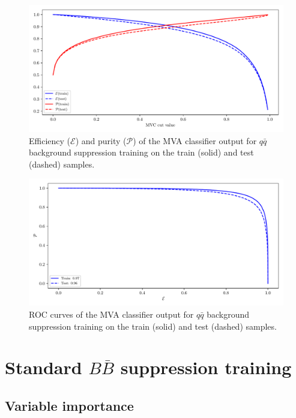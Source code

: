\begin{figure}[H]
\centering
\captionsetup{width=0.8\linewidth}
\includegraphics[width=\linewidth]{fig/addendums/QQ_effpur}
\caption{Efficiency ($\mathcal{E}$) and purity ($\mathcal{P}$) of the MVA classifier output for $q\bar q$ background suppression training on the train (solid) and test (dashed) samples.}
\end{figure}

\begin{figure}[H]
\centering
\captionsetup{width=0.8\linewidth}
\includegraphics[width=\linewidth]{fig/addendums/QQ_roc}
\caption{ROC curves of the MVA classifier output for $q\bar q$ background suppression training on the train (solid) and test (dashed) samples.}
\end{figure}

\section*{Standard $B \bar B$ suppression training}

\subsection*{Variable importance}

